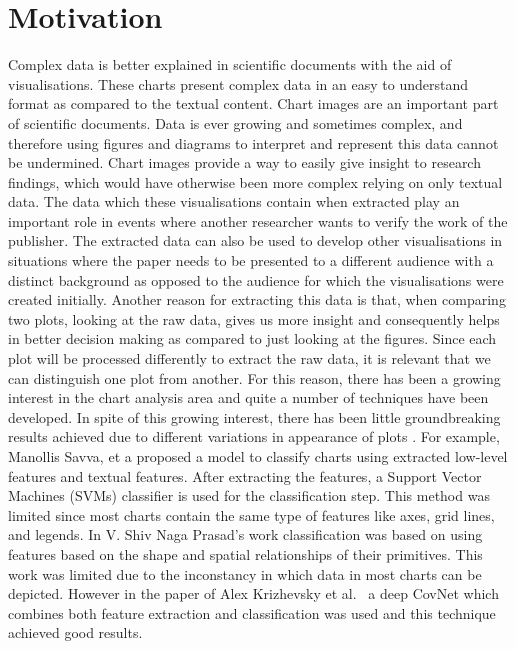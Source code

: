 \documentclass[12pt, a4paper,oneside]{report}
\begin{document}
\section{Motivation}
Complex data is better explained in scientific documents with the aid of visualisations. These charts present complex data in an easy to understand format as compared to the textual content. 
Chart images are an important part of scientific documents.
Data is ever growing and sometimes complex, and therefore using figures and diagrams to interpret and represent this data cannot be undermined. Chart images provide a way to easily give insight to  research findings, which would have otherwise been more complex relying on only textual data. The data which these visualisations contain when extracted play an important role in events where another researcher wants to verify the work of the publisher. The extracted data can also be used to develop other visualisations in situations where the paper needs to be presented to a different audience with a distinct background as opposed to the audience for which the visualisations were created initially. Another reason for extracting this data is that, when comparing two plots, looking at the raw data, gives us more insight and consequently helps in better decision making as compared to just looking at the figures. Since each plot will be processed differently to extract the raw data, it is relevant that we can distinguish one plot from another. For this reason, there has been a growing interest in the chart analysis area and quite a number of techniques have been developed. In spite of this growing interest, there has been little groundbreaking results achieved due to different variations in appearance of plots \cite{liu2015chart}. For example, Manollis Savva, et a \cite{savva2011revision} proposed a model to classify charts using extracted low-level features and textual features. After extracting the features, a  Support Vector Machines (SVMs) classifier is used for the classification step. This method was limited since most charts contain the same type of features like axes, grid lines, and legends. In V. Shiv Naga Prasad's work \cite{prasad2007classifying} classification was based on using features based on the shape and spatial relationships of their primitives. This work was limited due to the inconstancy in which data in most charts can be depicted. However in the paper of Alex Krizhevsky et al.~\cite{krizhevsky2012imagenet} a deep CovNet which combines both feature extraction and classification was used and this technique achieved good results.
\end{document}
